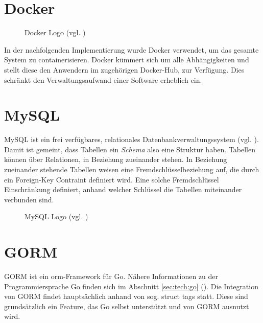 \section{Docker}\label{sec:tech:docker}
\begin{figure}[h!] %
    \centering
    
    \caption{Docker Logo (vgl. \cite{DockerLogo})}
\end{figure} 
In der nachfolgenden Implementierung wurde Docker verwendet, um das gesamte System zu containerisieren. Docker kümmert sich um alle Abhängigkeiten und stellt diese den Anwendern im zugehörigen Docker-Hub, zur Verfügung. Dies schränkt den Verwaltungsaufwand einer Software erheblich ein.

\section{MySQL}
MySQL ist ein frei verfügbares, relationales Datenbankverwaltungssystem (vgl. \cite{wiki:mysql}). Damit ist gemeint, dass Tabellen ein \textit{Schema} also eine Struktur haben. Tabellen können über Relationen, in Beziehung zueinander stehen. In Beziehung zueinander stehende Tabellen weisen eine Fremdschlüsselbeziehung auf, die durch ein Foreign-Key Contraint definiert wird. Eine solche Fremdschlüssel Einschränkung definiert, anhand welcher Schlüssel die Tabellen miteinander verbunden sind. 
\begin{figure}[h!]
    \centering
    
    \caption{MySQL Logo (vgl. \cite{MySqlLogo})}
\end{figure} 

\newpage
\section{GORM}\label{sec:theory:orm}
GORM ist ein \acrlong{orm}-Framework für Go. Nähere Informationen zu der Programmiersprache Go finden sich im Abschnitt \ref{sec:tech:go} (). Die Integration von GORM findet hauptsächlich anhand von sog. \frqq{}struct tags\frqq{} statt. Diese sind grundsätzlich ein Feature, das Go selbst unterstützt und von GORM ausnutzt wird. 

